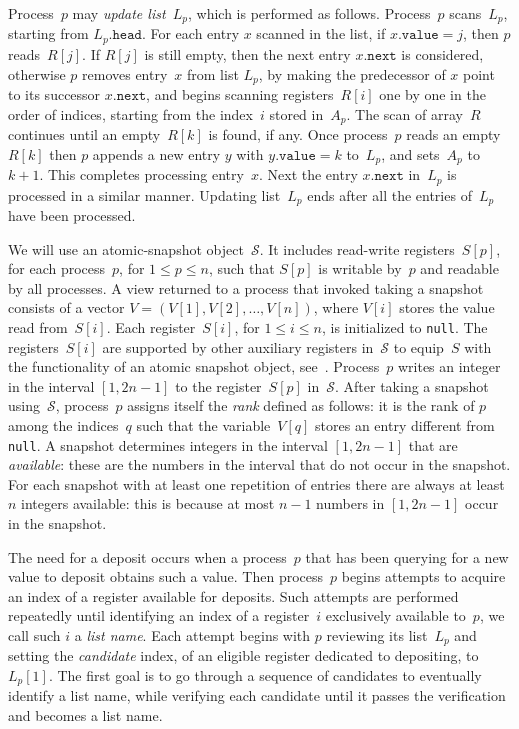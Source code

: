 \documentclass[11pt]{article}
\newcommand{\cS}{\mathcal{S}}
\begin{document}
Process~$p$ may \emph{update list~$L_p$}, which is performed as follows.
Process~$p$ scans~$L_p$, starting from $L_p.\texttt{head}$.
For each entry $x$ scanned in the list, if $x.\texttt{value}=j$, then $p$ reads~$R[j]$. 
If $R[j]$ is still empty, then the next entry $x.\texttt{next}$ is considered, otherwise $p$ removes entry~$x$ from  list $L_p$, by making the predecessor of $x$ point to its successor $x.\texttt{next}$, and begins scanning registers~$R[i]$ one by one in the order of indices, starting from the index~$i$ stored in~$A_p$.
The scan of array~$R$ continues until an empty~$R[k]$ is found, if any.
Once process~$p$ reads an empty $R[k]$ then $p$ appends a new entry $y$ with $y.\texttt{value}=k$  to~$L_p$, and sets~$A_p$ to~$k+1$.
This completes processing entry~$x$.
Next the entry $x.\texttt{next}$ in~$L_p$ is processed in a similar manner.
Updating list~$L_p$ ends after all the entries of~$L_p$ have been processed.

We will use an atomic-snapshot object~$\cS$. 
It includes read-write registers~$S[p]$, for each process~$p$, for $1\le p\le n$, such that $S[p]$ is writable by~$p$ and readable by all processes.
A view returned to a process that invoked taking a snapshot consists of a vector $V=(V[1],V[2],\ldots,V[n])$, where $V[i]$ stores the value read from~$S[i]$.
Each register~$S[i]$, for $1\le i\le n$, is initialized to \texttt{null}.
The registers~$S[i]$ are supported by other auxiliary registers in~$\cS$ to equip~$S$ with the functionality of an atomic snapshot object, see~\cite{AfekADGMS93}.
Process~$p$ writes an integer in the interval $[1,2n-1]$ to the register~$S[p]$ in~$\cS$.
After taking a snapshot using~$\cS$, process~$p$ assigns itself the \emph{rank} defined as follows: it is the rank of $p$ among the indices~$q$ such that the variable~$V[q]$ stores an entry different from \texttt{null}.
A snapshot determines integers in the interval $[1,2n-1]$ that are \emph{available}: these are the numbers in the interval that do not occur in the snapshot.
For each snapshot with at least one repetition of entries there are always at least $n$ integers available: this is because at most $n-1$ numbers in $[1,2n-1]$ occur in the snapshot.

The need for a deposit occurs when a process~$p$ that has been querying for a new value to deposit obtains such a value.
Then process~$p$ begins attempts to acquire an index of a register available for deposits.
Such attempts are performed repeatedly until identifying an index of a register~$i$ exclusively available to~$p$, we call such $i$ a \emph{list name}.
Each attempt begins with $p$ reviewing its list~$L_p$ and setting the \emph{candidate} index, of an eligible register dedicated to depositing, to~$L_p[1]$.
The first goal is to go through a sequence of candidates to eventually identify a list name, while verifying each candidate until it passes the verification and becomes a list name.
\end{document}
